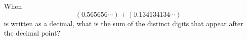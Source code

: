 When \[(0.565656\cdots)+(0.134134134\cdots)\]is written as a decimal, what is the sum of the distinct digits that appear after the decimal point?
